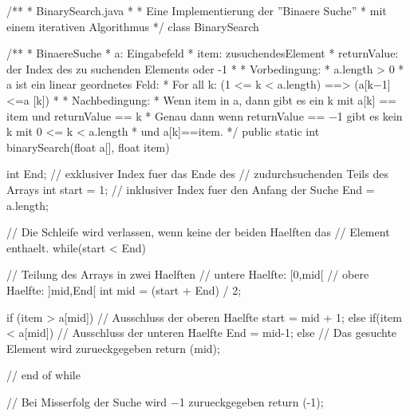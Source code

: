 \documentclass{bschlangaul-aufgabe}
\begin{document}
%

\bigskip



\begin{liJavaAngabe}
/**
 * BinarySearch.java
 *
 * Eine Implementierung der ”Binaere Suche”
 * mit einem iterativen Algorithmus
 */
class BinarySearch {

  /**
   * BinaereSuche
   * a: Eingabefeld
   * item: zusuchendesElement
   * returnValue: der Index des zu suchenden Elements oder -1
   *
   * Vorbedingung:
   * a.length > 0
   * a ist ein linear geordnetes Feld:
   * For all k: (1 <= k < a.length) ==> (a[k−1] <=a [k])
   *
   * Nachbedingung:
   * Wenn item in a, dann gibt es ein k mit a[k] == item und returnValue == k
   * Genau dann wenn returnValue == −1 gibt es kein k mit 0 <= k < a.length
   * und a[k]==item.
   */
  public static int binarySearch(float a[], float item) {

    int End;  // exklusiver Index fuer das Ende des
              // zudurchsuchenden Teils des Arrays
    int start = 1; // inklusiver Index fuer den Anfang der Suche
    End = a.length;

    // Die Schleife wird verlassen, wenn keine der beiden Haelften das
    // Element enthaelt.
    while(start < End) {

      // Teilung des Arrays in zwei Haelften
      // untere Haelfte: [0,mid[
      // obere Haelfte: ]mid,End[
      int mid = (start + End) / 2;

      if (item > a[mid]) {
        // Ausschluss der oberen Haelfte
        start = mid + 1;
      } else if(item < a[mid]) {
        // Ausschluss der unteren Haelfte
        End = mid-1;
      } else {
        // Das gesuchte Element wird zurueckgegeben
        return (mid);
      }
    } // end of while

    // Bei Misserfolg der Suche wird −1 zurueckgegeben
    return (-1);
  }
}
\end{liJavaAngabe}
\end{document}

